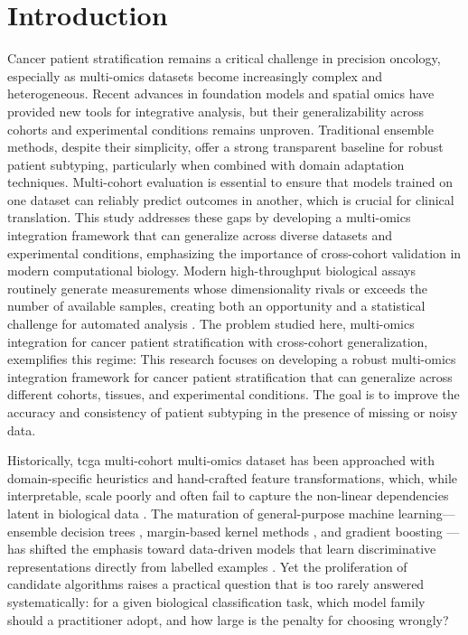 \documentclass[conference]{IEEEtran}
\begin{document}
\section{Introduction}
\label{sec:intro}
Cancer patient stratification remains a critical challenge in precision oncology, especially as multi-omics datasets become increasingly complex and heterogeneous. Recent advances in foundation models and spatial omics have provided new tools for integrative analysis, but their generalizability across cohorts and experimental conditions remains unproven. Traditional ensemble methods, despite their simplicity, offer a strong transparent baseline for robust patient subtyping, particularly when combined with domain adaptation techniques. Multi-cohort evaluation is essential to ensure that models trained on one dataset can reliably predict outcomes in another, which is crucial for clinical translation. This study addresses these gaps by developing a multi-omics integration framework that can generalize across diverse datasets and experimental conditions, emphasizing the importance of cross-cohort validation in modern computational biology. Modern high-throughput biological assays routinely generate measurements whose
dimensionality rivals or exceeds the number of available samples, creating both an opportunity
and a statistical challenge for automated analysis \cite{libbrecht2015machine}. The problem
studied here, multi-omics integration for cancer patient stratification with cross-cohort generalization, exemplifies this regime: This research focuses on developing a robust multi-omics integration framework for cancer patient stratification that can generalize across different cohorts, tissues, and experimental conditions. The goal is to improve the accuracy and consistency of patient subtyping in the presence of missing or noisy data.

Historically, tcga multi-cohort multi-omics dataset has been approached with domain-specific heuristics and
hand-crafted feature transformations, which, while interpretable, scale poorly and often fail
to capture the non-linear dependencies latent in biological data \cite{hastie2009elements}.
The maturation of general-purpose machine learning---ensemble decision trees
\cite{breiman2001random}, margin-based kernel methods \cite{cortes1995support}, and gradient
boosting \cite{friedman2001greedy}---has shifted the emphasis toward data-driven models that
learn discriminative representations directly from labelled examples \cite{lecun2015deep}.
Yet the proliferation of candidate algorithms raises a practical question that is too rarely
answered systematically: for a given biological classification task, which model family should
a practitioner adopt, and how large is the penalty for choosing wrongly?
\end{document}
